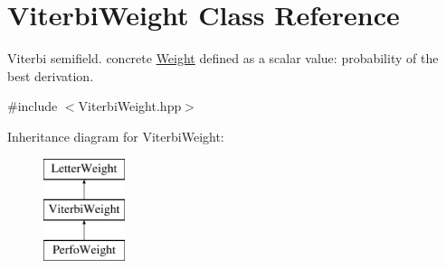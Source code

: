 \hypertarget{classViterbiWeight}{}\section{Viterbi\+Weight Class Reference}
\label{classViterbiWeight}


Viterbi semifield. concrete \mbox{\hyperlink{classWeight}{Weight}} defined as a scalar value\+: probability of the best derivation.  




{\ttfamily \#include $<$Viterbi\+Weight.\+hpp$>$}

Inheritance diagram for Viterbi\+Weight\+:\begin{figure}[H]
\begin{center}
\leavevmode
\includegraphics[height=3.000000cm]{classViterbiWeight}
\end{center}
\end{figure}
